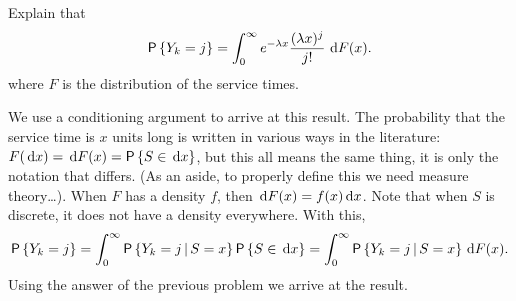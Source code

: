 \begin{question}
 Explain that 
\begin{equation}\label{eq:10}
  \P{Y_k = j} = \int_0^\infty e^{-\lambda x}\frac{(\lambda x)^j}{j!}\, \d F(x).
\end{equation}
where $F$ is the distribution of the service times.
\begin{solution}
  We use a conditioning argument to arrive at this result. The
  probability that the service time is $x$ units long is written in
  various ways in the literature: $F(\d x) = \d F(x) = \P{S\in \d x}$,
  but this all means the same thing, it is only the notation that
  differs.  (As an aside, to properly define this we need measure
  theory\ldots). When $F$ has a density $f$, then
  $\,\text{d}F(x) = f(x) \,\text{d}x$.  Note that when $S$ is discrete, it does not
  have a density everywhere. With this,
    \begin{equation*}
    \P{Y_k=j} = \int_0^\infty \P{Y_k =j\given S=x}\P{S\in \d x} =
    \int_0^\infty \P{Y_k =j\given S=x} \d F(x).
    \end{equation*}
    Using the answer of the previous problem we arrive at the result.
\end{solution}
\end{question}

